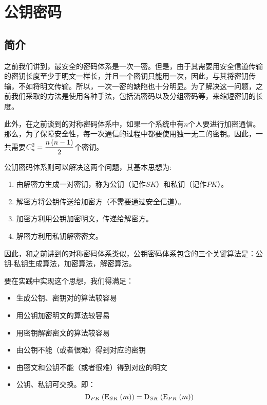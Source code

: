 \chapter{公钥密码}
\section{简介}
之前我们讲到，最安全的密码体系是一次一密。但是，由于其需要用安全信道传输的密钥长度至少于明文一样长，并且一个密钥只能用一次，因此，与其将密钥传输，不如将明文传输。所以，一次一密的缺陷也十分明显。为了解决这一问题，之前我们采取的方法是使用各种手法，包括流密码以及分组密码等，来缩短密钥的长度。\par
此外，在之前谈到的对称密码体系中，如果一个系统中有$n$个人要进行加密通信。那么，为了保障安全性，每一次通信的过程中都要使用独一无二的密钥。因此，一共需要$\displaystyle C_n^2=\frac{n\left( {n-1}\right)}{2}$个密钥。\par
公钥密码体系则可以解决这两个问题，其基本思想为:
\begin{enumerate}
	\item 由解密方生成一对密钥，称为公钥（记作$SK$）和私钥（记作$PK$）。
	\item 解密方将公钥传送给加密方（不需要通过安全信道）。
	\item 加密方利用公钥加密明文，传递给解密方。
	\item 解密方利用私钥解密密文。
\end{enumerate}

因此，和之前讲到的对称密码体系类似，公钥密码体系包含的三个关键算法是：公钥-私钥生成算法，加密算法，解密算法。\par
要在实践中实现这个思想，我们得满足：
\begin{itemize}
	\item 生成公钥、密钥对的算法较容易
	\item 用公钥加密明文的算法较容易
	\item 用密钥解密密文的算法较容易
	\item 由公钥不能（或者很难）得到对应的密钥
	\item 由密文和公钥不能（或者很难）得到对应的明文
	\item 公钥、私钥可交换。即：
	\begin{equation}
	{\mathrm{D}_{PK}\left({{\mathrm{E}_{SK}\left({m}\right)}}\right)} = {\mathrm{D}_{SK}\left({{\mathrm{E}_{PK}\left({m}\right)}}\right)}
	\end{equation}
\end{itemize}

